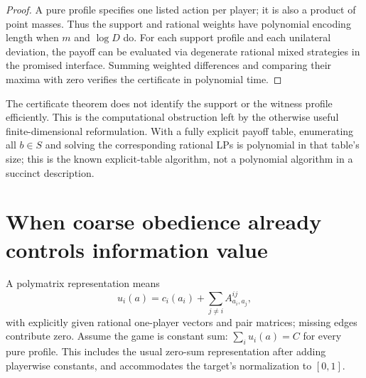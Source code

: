 \documentclass[11pt]{article}
\theoremstyle{definition}
\begin{document}
\begin{proof}
A pure profile specifies one listed action per player; it is also a product of point masses. Thus the support and rational weights have polynomial encoding length when $m$ and $\log D$ do. For each support profile and each unilateral deviation, the payoff can be evaluated via degenerate rational mixed strategies in the promised interface. Summing weighted differences and comparing their maxima with zero verifies the certificate in polynomial time.
\end{proof}

The certificate theorem does not identify the support or the witness profile efficiently. This is the computational obstruction left by the otherwise useful finite-dimensional reformulation. With a fully explicit payoff table, enumerating all $b\in S$ and solving the corresponding rational LPs is polynomial in that table's size; this is the known explicit-table algorithm, not a polynomial algorithm in a succinct description.

\section*{When coarse obedience already controls information value}
A polymatrix representation means
\[
 u_i(a)=c_i(a_i)+\sum_{j\ne i}A^{ij}_{a_i,a_j},
\]
with explicitly given rational one-player vectors and pair matrices; missing edges contribute zero. Assume the game is constant sum:
$\sum_i u_i(a)=C$ for every pure profile. This includes the usual zero-sum representation after adding playerwise constants, and accommodates the target's normalization to $[0,1]$.
\end{document}
